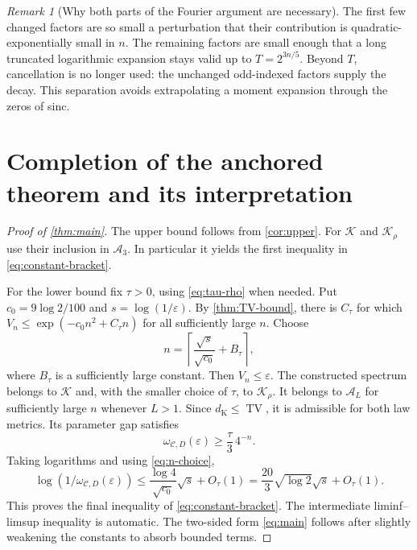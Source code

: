 \documentclass[11pt,a4paper]{article}
\numberwithin{equation}{section}
\theoremstyle{definition}
\theoremstyle{remark}
\newtheorem{remark}[theorem]{Remark}
\DeclareMathOperator{\TV}{TV}
\newcommand{\A}{\mathcal A}
\newcommand{\K}{\mathcal K}
\newcommand{\eps}{\varepsilon}
\newcommand{\distK}{d_{\mathrm K}}
\begin{document}
\begin{remark}[Why both parts of the Fourier argument are necessary]
The first few changed factors are so small a perturbation that their
contribution is quadratic-exponentially small in $n$. The remaining factors
are small enough that a long truncated logarithmic expansion stays valid up
to $T=2^{3n/5}$. Beyond $T$, cancellation is no longer used: the unchanged
odd-indexed factors supply the decay. This separation avoids extrapolating
a moment expansion through the zeros of sinc.
\end{remark}

\section{Completion of the anchored theorem and its interpretation}
\label{sec:completion}

\begin{proof}[Proof of \cref{thm:main}]
The upper bound follows from \cref{cor:upper}. For $\K$ and $\K_\rho$
use their inclusion in $\A_3$. In particular it yields the first inequality
in \eqref{eq:constant-bracket}.

For the lower bound fix $\tau>0$, using \eqref{eq:tau-rho} when needed.
Put $c_0=9\log2/100$ and $s=\log(1/\eps)$. By
\cref{thm:TV-bound}, there is $C_\tau$ for which
$V_n\le\exp(-c_0n^2+C_\tau n)$ for all sufficiently large $n$.
Choose
\begin{equation}
 n=\left\lceil\frac{\sqrt{s}}{\sqrt{c_0}}+B_\tau\right\rceil,
 \label{eq:n-choice}
\end{equation}
where $B_\tau$ is a sufficiently large constant. Then $V_n\le\eps$.
The constructed spectrum belongs to $\K$ and, with the smaller choice of
$\tau$, to $\K_\rho$. It belongs to $\A_L$ for sufficiently large $n$
whenever $L>1$. Since $\distK\le\TV$, it is admissible for both law
metrics. Its parameter gap satisfies
\[
 \omega_{\mathcal C,D}(\eps)\ge\frac\tau3\,4^{-n}.
\]
Taking logarithms and using \eqref{eq:n-choice},
\[
 \log(1/\omega_{\mathcal C,D}(\eps))
 \le\frac{\log4}{\sqrt{c_0}}\sqrt{s}+O_\tau(1)
 =\frac{20}{3}\sqrt{\log2}\sqrt{s}+O_\tau(1).
\]
This proves the final inequality of \eqref{eq:constant-bracket}. The
intermediate liminf--limsup inequality is automatic. The two-sided form
\eqref{eq:main} follows after slightly weakening the constants to absorb
bounded terms.
\end{proof}
\end{document}
